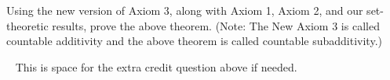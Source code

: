 \documentclass[12pt]{article}
\begin{document}
\begin{enumerate}
{Using the new version of Axiom 3, along with Axiom 1, Axiom 2, and our set-theoretic results, prove the above theorem. (Note: The New Axiom 3 is called countable additivity and the above theorem is called countable subadditivity.) 
}

\newpage
~ This is space for the extra credit question above if needed. \newpage

\end{enumerate}
\end{document}
